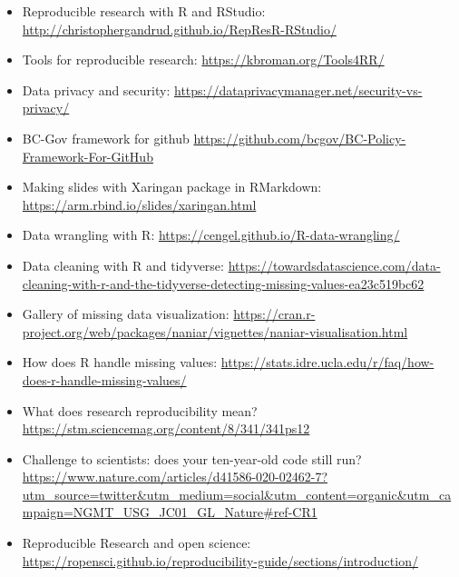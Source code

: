 \documentclass[
]{book}
\providecommand{\tightlist}{%
  \setlength{\itemsep}{0pt}\setlength{\parskip}{0pt}}
\begin{document}
\begin{itemize}
\tightlist
\item
  Reproducible research with R and RStudio: \url{http://christophergandrud.github.io/RepResR-RStudio/}
\item
  Tools for reproducible research: \url{https://kbroman.org/Tools4RR/}
\item
  Data privacy and security: \url{https://dataprivacymanager.net/security-vs-privacy/}
\item
  BC-Gov framework for github \url{https://github.com/bcgov/BC-Policy-Framework-For-GitHub}
\item
  Making slides with Xaringan package in RMarkdown: \url{https://arm.rbind.io/slides/xaringan.html}
\item
  Data wrangling with R: \url{https://cengel.github.io/R-data-wrangling/}
\item
  Data cleaning with R and tidyverse: \url{https://towardsdatascience.com/data-cleaning-with-r-and-the-tidyverse-detecting-missing-values-ea23c519bc62}
\item
  Gallery of missing data visualization: \url{https://cran.r-project.org/web/packages/naniar/vignettes/naniar-visualisation.html}
\item
  How does R handle missing values: \url{https://stats.idre.ucla.edu/r/faq/how-does-r-handle-missing-values/}
\item
  What does research reproducibility mean? \url{https://stm.sciencemag.org/content/8/341/341ps12}
\item
  Challenge to scientists: does your ten-year-old code still run? \url{https://www.nature.com/articles/d41586-020-02462-7?utm_source=twitter\&utm_medium=social\&utm_content=organic\&utm_campaign=NGMT_USG_JC01_GL_Nature\#ref-CR1}
\item
  Reproducible Research and open science: \url{https://ropensci.github.io/reproducibility-guide/sections/introduction/}
\end{itemize}
\end{document}
